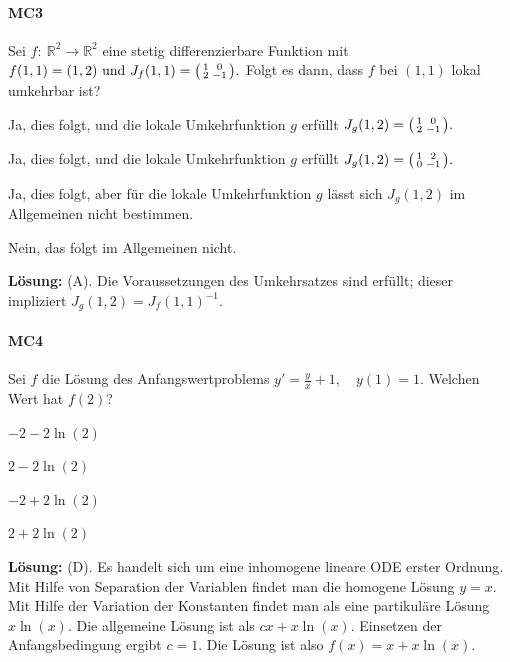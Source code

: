 \documentclass[a4paper,10pt]{article}
\def\R{\mathbb{R}}
\begin{document}
{\paragraph{MC3} Sei \( f: \: \R^2 \to \R^2 \) eine stetig differenzierbare Funktion mit
\(
    f(1, 1) = (1, 2) \text{ und } J_f(1, 1) = \begin{psmallmatrix} 1 & 0 \\ 2 & -1 \end{psmallmatrix} \text{.}
\)
Folgt es dann, dass \( f \) bei \( (1, 1) \) lokal umkehrbar ist?
\begin{enumerate*}
    \item Ja, dies folgt, und die lokale Umkehrfunktion \( g \) erfüllt
    \(
        J_g(1, 2) = \begin{psmallmatrix} 1 & 0 \\ 2 & -1 \end{psmallmatrix} \text{.}
    \)
    \item Ja, dies folgt, und die lokale Umkehrfunktion \( g \) erfüllt
    \(
        J_g(1, 2) = \begin{psmallmatrix} 1 & 2 \\ 0 & -1 \end{psmallmatrix} \text{.}
    \)
    \item Ja, dies folgt, aber für die lokale Umkehrfunktion \( g \) lässt sich \( J_g(1, 2) \) im Allgemeinen nicht bestimmen.
    \item Nein, das folgt im Allgemeinen nicht.
\end{enumerate*}
\textbf{Lösung:} (A). Die Voraussetzungen des Umkehrsatzes sind erfüllt; dieser impliziert \( J_g(1, 2) = J_f(1, 1)^{-1} \).

\paragraph{MC4} Sei \( f \) die Lösung des Anfangswertproblems
\(
    y' = \frac{y}{x} + 1, \quad y(1) = 1 \text{.}
\)
Welchen Wert hat \( f(2) \)?
\begin{enumerate*}
    \item \( -2 - 2 \ln(2) \)
    \item \( 2 - 2 \ln(2) \)
    \item \( -2 + 2 \ln(2) \)
    \item \( 2 + 2 \ln(2) \)
\end{enumerate*}
\textbf{Lösung:} (D). Es handelt sich um eine inhomogene lineare ODE erster Ordnung. Mit Hilfe von Separation der Variablen findet man die homogene Lösung \( y = x \). Mit Hilfe der Variation der Konstanten findet man als eine partikuläre Lösung \( x \ln(x) \). Die allgemeine Lösung ist als \( cx + x \ln(x) \). Einsetzen der Anfangsbedingung ergibt \( c = 1 \). Die Lösung ist also \( f(x) = x + x \ln(x) \).

}
\end{document}
